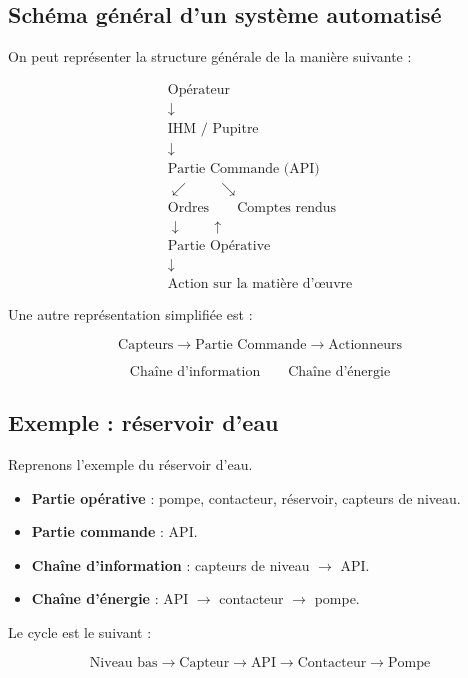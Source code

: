 \subsection{Schéma général d'un système automatisé}

On peut représenter la structure générale de la manière suivante :

\[
\begin{array}{c}
\text{Opérateur} \\
\downarrow \\
\text{IHM / Pupitre} \\
\downarrow \\
\text{Partie Commande (API)} \\
\swarrow \qquad \searrow \\
\text{Ordres} \qquad \text{Comptes rendus} \\
\downarrow \qquad \uparrow \\
\text{Partie Opérative} \\
\downarrow \\
\text{Action sur la matière d'œuvre}
\end{array}
\]

Une autre représentation simplifiée est :

\[
\text{Capteurs} \rightarrow \text{Partie Commande} \rightarrow \text{Actionneurs}
\]

\[
\text{Chaîne d'information} \qquad \text{Chaîne d'énergie}
\]

\subsection{Exemple : réservoir d'eau}

Reprenons l'exemple du réservoir d'eau.

\begin{itemize}
    \item \textbf{Partie opérative} : pompe, contacteur, réservoir, capteurs de niveau.
    \item \textbf{Partie commande} : API.
    \item \textbf{Chaîne d'information} : capteurs de niveau $\rightarrow$ API.
    \item \textbf{Chaîne d'énergie} : API $\rightarrow$ contacteur $\rightarrow$ pompe.
\end{itemize}

Le cycle est le suivant :

\[
\text{Niveau bas} \rightarrow \text{Capteur} \rightarrow \text{API} \rightarrow \text{Contacteur} \rightarrow \text{Pompe}
\]

